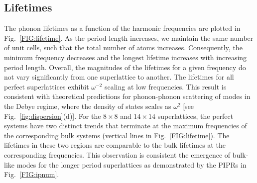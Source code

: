 \documentclass[aps,prb,preprint,preprintnumbers,amsmath,amssymb,floatfix,superscriptaddress]{revtex4}
\begin{document}


\subsection{Lifetimes}

The phonon lifetimes as a function of the harmonic frequencies are plotted in Fig.~\ref{FIG:lifetime}. As the period length increases, we maintain the same number of unit cells, such that the total number of atoms increases. Consequently, the minimum frequency decreases and the longest lifetime increases with increasing period length. Overall, the magnitudes of the lifetimes for a given frequency do not vary significantly from one superlattice to another. The lifetimes for all perfect superlattices exhibit $\omega^{-2}$ scaling at low frequencies. This result is consistent with theoretical predictions for phonon-phonon scattering of modes in the Debye regime, where the density of states scales as $\omega^{2}$ [see Fig.~\ref{fig:dispersion}(d)].\cite{Klemens_Thermal_1951} For the $8\times8$ and $14\times14$ superlattices, the perfect systems have two distinct trends that terminate at the maximum frequencies of the corresponding bulk systems (vertical lines in Fig.~\ref{FIG:lifetime}). The lifetimes in these two regions are comparable to the bulk lifetimes at the corresponding frequencies. This observation is consistent the emergence of bulk-like modes for the longer period superlattices as demonstrated by the PIPRs in Fig.~\ref{FIG:ipnum}.
\end{document}
